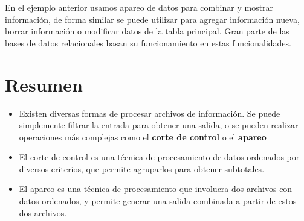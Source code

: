 

En el ejemplo anterior usamos apareo de datos para combinar y mostrar
información, de forma similar se puede utilizar para agregar información nueva,
borrar información o modificar datos de la tabla principal. Gran parte de las
bases de datos relacionales basan su funcionamiento en estas funcionalidades.

\section{Resumen}

\begin{itemize}

\item Existen diversas formas de procesar archivos de información.  Se
puede simplemente filtrar la entrada para obtener una salida, o se pueden
realizar operaciones más complejas como el {\bf corte de control} o el {\bf
apareo}

\item El corte de control es una técnica de procesamiento de datos
ordenados por diversos criterios, que permite agruparlos para obtener
subtotales.

\item El apareo es una técnica de procesamiento que involucra dos archivos
con datos ordenados, y permite generar una salida combinada a partir de
estos dos archivos.

\end{itemize}

